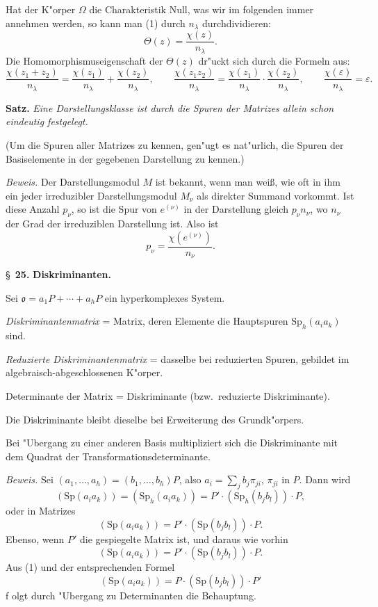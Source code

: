 \documentclass[12pt,a4paper]{article}
\theoremstyle{plain}
\newcommand{\Sp}{\mathrm{Sp}}
\begin{document}
Hat der K"orper $\Omega$ die Charakteristik Null, was wir im folgenden immer annehmen werden, so kann man (1) durch $n_\lambda$ durchdividieren:
\[
\Theta(z) = \frac{\chi(z)}{n_\lambda}.
\]
Die Homomorphismuseigenschaft der $\Theta(z)$ dr"uckt sich durch die Formeln aus:
\[
\frac{\chi(z_1 + z_2)}{n_\lambda} = \frac{\chi(z_1)}{n_\lambda} + \frac{\chi(z_2)}{n_\lambda},\qquad
\frac{\chi(z_1 z_2)}{n_\lambda} = \frac{\chi(z_1)}{n_\lambda} \cdot \frac{\chi(z_2)}{n_\lambda},\qquad
\frac{\chi(\varepsilon)}{n_\lambda} = \varepsilon.
\]

\medskip\noindent\textbf{Satz.}
\textit{Eine Darstellungsklasse ist durch die Spuren der Matrizes allein schon eindeutig festgelegt.}

(Um die Spuren aller Matrizes zu kennen, gen"ugt es nat"urlich, die Spuren der Basiselemente in der gegebenen Darstellung zu kennen.)

\noindent\textit{Beweis.}
Der Darstellungsmodul $M$ ist bekannt, wenn man wei\ss, wie oft in ihm ein jeder irreduzibler Darstellungsmodul $M_\nu$ als direkter Summand vorkommt. Ist diese Anzahl $p_\nu$, so ist die Spur von $e^{(\nu)}$ in der Darstellung gleich $p_\nu n_\nu$, wo $n_\nu$ der Grad der irreduziblen Darstellung ist. Also ist
\[
p_\nu = \frac{\chi(e^{(\nu)})}{n_\nu}.
\]

\newpage
\S~\textbf{25.}
\textbf{Diskriminanten.}

\smallskip

\noindent
Sei $\mathfrak{o} = a_1P + \cdots + a_hP$ ein hyperkomplexes System.

\textit{Diskriminantenmatrix} = Matrix, deren Elemente die Hauptspuren $\Sp_h(a_i a_k)$ sind.

\textit{Reduzierte Diskriminantenmatrix} = dasselbe bei reduzierten Spuren, gebildet im algebraisch-abgeschlossenen K"orper.

Determinante der Matrix = Diskriminante (bzw.\ reduzierte Diskriminante).

Die Diskriminante bleibt dieselbe bei Erweiterung des Grundk"orpers.

Bei "Ubergang zu einer anderen Basis multipliziert sich die Diskriminante mit dem Quadrat der Transformationsdeterminante.

\noindent\textit{Beweis.}
Sei $(a_1,\ldots,a_h) = (b_1,\ldots,b_h)P$, also $a_i = \sum_j b_j\pi_{ji}$, $\pi_{ji}$ in $P$.
Dann wird
\[
(\Sp(a_i a_k)) = (\Sp_h(a_i a_k)) = P' \cdot (\Sp_h(b_j b_l)) \cdot P,
\]
oder in Matrizes
\[
(\Sp(a_i a_k)) = P' \cdot (\Sp(b_j b_l)) \cdot P.\tag{1}
\]
Ebenso, wenn $P'$ die gespiegelte Matrix ist, und daraus wie vorhin
\[
(\Sp(a_i a_k)) = P' \cdot (\Sp(b_j b_l)) \cdot P.
\]
Aus (1) und der entsprechenden Formel
\[
(\Sp(a_i a_k)) = P \cdot (\Sp(b_j b_l)) \cdot P'
\]
f
olgt durch "Ubergang zu Determinanten die Behauptung.
\end{document}
